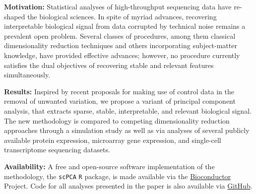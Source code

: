 \textbf{Motivation:} Statistical analyses of high-throughput sequencing data have re-shaped the biological sciences. In spite of myriad advances, recovering interpretable biological signal from data corrupted by technical noise remains a prevalent open problem. Several classes of procedures, among them classical dimensionality reduction techniques and others incorporating subject-matter knowledge, have provided effective advances; however, no procedure currently satisfies the dual objectives of recovering stable and relevant features simultaneously. 

\textbf{Results:} Inspired by recent proposals for making use of control data in the removal of unwanted variation, we propose a variant of principal component analysis,  that extracts sparse, stable, interpretable, and relevant biological signal. The new methodology is compared to competing
dimensionality reduction approaches through a simulation study as well as via analyses of several publicly available protein expression, microarray gene expression, and single-cell transcriptome sequencing datasets.

\textbf{Availability:} A free and open-source software implementation of the methodology, the \texttt{scPCA} \texttt{R} package, is made available via the \href{https://bioconductor.org/packages/release/bioc/html/scPCA.html}{Bioconductor} Project. Code for all analyses presented in the paper is also available via \href{https://github.com/PhilBoileau/EHDBDscPCA}{GitHub}.

